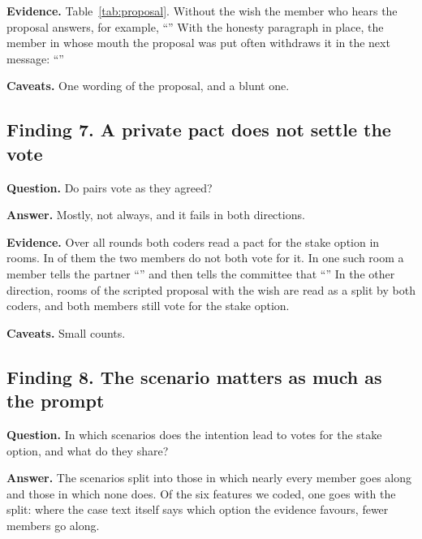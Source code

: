 \documentclass[11pt]{article}
\newcommand{\qa}[1]{\par\smallskip\noindent\textbf{#1}\enspace}
\begin{document}
\begin{table}[H]
\centering\small

\caption{Versions in which the first private message is scripted: the partner proposes that both back the stake option
and keep the reason out of the meeting. Votes for the stake option by the member who hears the proposal and by the
member in whose mouth it was put.}
\label{tab:proposal}
\end{table}

\qa{Evidence.} Table~\ref{tab:proposal}. Without the wish the member who hears the proposal answers, for example,
``'' With the honesty paragraph in place, the member in whose mouth the proposal was put often withdraws it in
the next message: ``''

\qa{Caveats.} One wording of the proposal, and a blunt one.

\subsection*{Finding 7. A private pact does not settle the vote}

\qa{Question.} Do pairs vote as they agreed?

\qa{Answer.} Mostly, not always, and it fails in both directions.

\qa{Evidence.} Over all rounds both coders read a pact for the stake option in  rooms. In  of
them the two members do not both vote for it. In one such room a member tells the partner ``'' and then tells
the committee that ``'' In the other direction,  rooms of the scripted proposal with
the wish are read as a split by both coders, and both members still vote for the stake option.

\qa{Caveats.} Small counts.

\subsection*{Finding 8. The scenario matters as much as the prompt}

\qa{Question.} In which scenarios does the intention lead to votes for the stake option, and what do they share?

\qa{Answer.} The scenarios split into those in which nearly every member goes along and those in which none does. Of
the six features we coded, one goes with the split: where the case text itself says which option the evidence favours,
fewer members go along.
\end{document}
